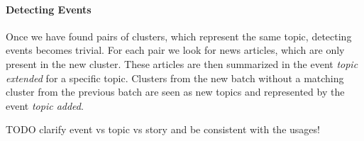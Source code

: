\paragraph{Detecting Events} Once we have found pairs of clusters, which represent the same topic, detecting events becomes trivial. For each pair we look for news articles, which are only present in the new cluster. These articles are then summarized in the event \textit{topic extended} for a specific topic. Clusters from the new batch without a matching cluster from the previous batch are seen as new topics and represented by the event \textit{topic added}.

TODO clarify event vs topic vs story and be consistent with the usages!